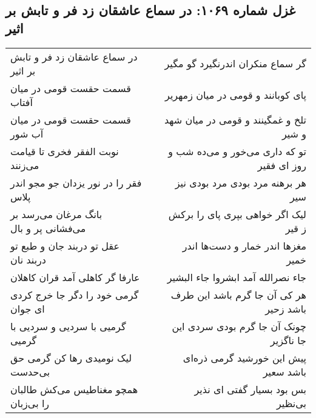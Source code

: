 \begin{center}
\section*{غزل شماره ۱۰۶۹: در سماع عاشقان زد فر و تابش بر اثیر}
\label{sec:1069}
\begin{longtable}{l p{0.5cm} r}
در سماع عاشقان زد فر و تابش بر اثیر
&&
گر سماع منکران اندرنگیرد گو مگیر
\\
قسمت حقست قومی در میان آفتاب
&&
پای کوبانند و قومی در میان زمهریر
\\
قسمت حقست قومی در میان آب شور
&&
تلخ و غمگینند و قومی در میان شهد و شیر
\\
نوبت الفقر فخری تا قیامت می‌زنند
&&
تو که داری می‌خور و می‌ده شب و روز ای فقیر
\\
فقر را در نور یزدان جو مجو اندر پلاس
&&
هر برهنه مرد بودی مرد بودی نیز سیر
\\
بانگ مرغان می‌رسد بر می‌فشانی پر و بال
&&
لیک اگر خواهی بپری پای را برکش ز قیر
\\
عقل تو دربند جان و طبع تو دربند نان
&&
مغزها اندر خمار و دست‌ها اندر خمیر
\\
عارفا گر کاهلی آمد قران کاهلان
&&
جاء نصرالله آمد ابشروا جاء البشیر
\\
گرمی خود را دگر جا خرج کردی ای جوان
&&
هر کی آن جا گرم باشد این طرف باشد زحیر
\\
گرمیی با سردیی و سردیی با گرمیی
&&
چونک آن جا گرم بودی سردی این جا ناگزیر
\\
لیک نومیدی رها کن گرمی حق بی‌حدست
&&
پیش این خورشید گرمی ذره‌ای باشد سعیر
\\
همچو مغناطیس می‌کش طالبان را بی‌زبان
&&
بس بود بسیار گفتی ای نذیر بی‌نظیر
\\
\end{longtable}
\end{center}
